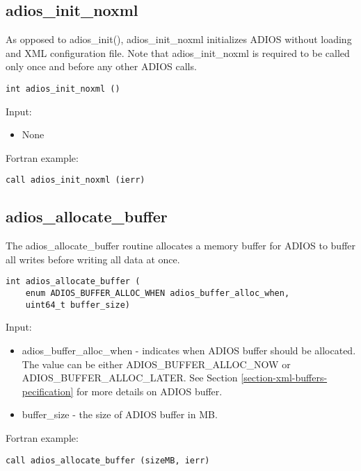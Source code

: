 \subsection{adios\_init\_noxml}

As opposed to adios\_init(), adios\_init\_noxml initializes ADIOS without loading
and XML configuration file. Note that adios\_init\_noxml is required to be called only 
once and before any other ADIOS calls. 

\begin{lstlisting}[alsolanguage=C,caption={},label={}]
int adios_init_noxml ()
\end{lstlisting}

Input: 
\begin{itemize}
\item None
\end{itemize}

Fortran example: 
\begin{lstlisting}[alsolanguage=Fortran,caption={},label={}]
call adios_init_noxml (ierr)
\end{lstlisting}


\subsection{adios\_allocate\_buffer}

The adios\_allocate\_buffer routine allocates a memory buffer for ADIOS to buffer all writes before writing all data at once. 

\begin{lstlisting}[alsolanguage=C,caption={},label={}]
int adios_allocate_buffer (
    enum ADIOS_BUFFER_ALLOC_WHEN adios_buffer_alloc_when,
    uint64_t buffer_size)
\end{lstlisting}

Input: 
\begin{itemize}
\item adios\_buffer\_alloc\_when - indicates when ADIOS buffer should be allocated. 
The value can be either {\small ADIOS\_BUFFER\_ALLOC\_NOW} or 
{\small ADIOS\_BUFFER\_ALLOC\_LATER}. See Section \ref{section-xml-buffers-pecification} 
for more details on ADIOS buffer.
\item buffer\_size - the size of ADIOS buffer in MB. 
\end{itemize}


Fortran example: 
\begin{lstlisting}[alsolanguage=Fortran,caption={},label={}]
call adios_allocate_buffer (sizeMB, ierr)
\end{lstlisting}

